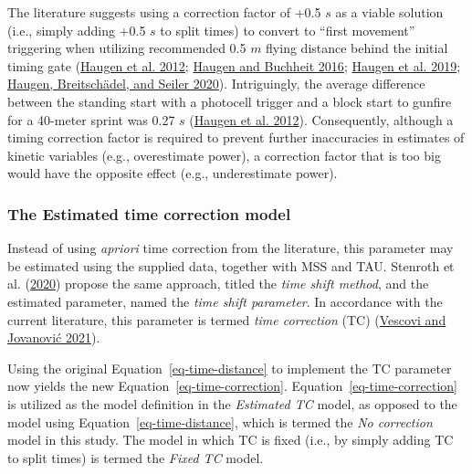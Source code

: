 \documentclass[
  letterpaper,
  DIV=11,
  numbers=noendperiod]{scrartcl}
\begin{document}
The literature suggests using a correction factor of +0.5 \(s\) as a
viable solution (i.e., simply adding +0.5 \(s\) to split times) to
convert to ``first movement'' triggering when utilizing recommended 0.5
\(m\) flying distance behind the initial timing gate
(\protect\hyperlink{ref-haugenDifferenceStartImpact2012}{Haugen et al.
2012}; \protect\hyperlink{ref-haugenSprintRunningPerformance2016}{Haugen
and Buchheit 2016};
\protect\hyperlink{ref-haugenSprintMechanicalVariables2019}{Haugen et
al. 2019};
\protect\hyperlink{ref-haugenSprintMechanicalProperties2020}{Haugen,
Breitschädel, and Seiler 2020}). Intriguingly, the average difference
between the standing start with a photocell trigger and a block start to
gunfire for a 40-meter sprint was 0.27 \(s\)
(\protect\hyperlink{ref-haugenDifferenceStartImpact2012}{Haugen et al.
2012}). Consequently, although a timing correction factor is required to
prevent further inaccuracies in estimates of kinetic variables (e.g.,
overestimate power), a correction factor that is too big would have the
opposite effect (e.g., underestimate power).

\hypertarget{the-estimated-time-correction-model}{%
\subsubsection{The Estimated time correction
model}\label{the-estimated-time-correction-model}}

Instead of using \emph{apriori} time correction from the literature,
this parameter may be estimated using the supplied data, together with
MSS and TAU. Stenroth et al.
(\protect\hyperlink{ref-stenrothForcevelocityProfilingIce2020}{2020})
propose the same approach, titled the \emph{time shift method}, and the
estimated parameter, named the \emph{time shift parameter}. In
accordance with the current literature, this parameter is termed
\emph{time correction} (TC)
(\protect\hyperlink{ref-vescoviSprintMechanicalCharacteristics2021}{Vescovi
and Jovanović 2021}).

Using the original Equation~\ref{eq-time-distance} to implement the TC
parameter now yields the new Equation~\ref{eq-time-correction}.
Equation~\ref{eq-time-correction} is utilized as the model definition in
the \emph{Estimated TC} model, as opposed to the model using
Equation~\ref{eq-time-distance}, which is termed the \emph{No
correction} model in this study. The model in which TC is fixed (i.e.,
by simply adding TC to split times) is termed the \emph{Fixed TC} model.
\end{document}

